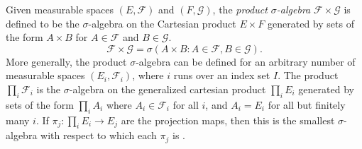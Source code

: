 \documentclass[12pt]{article}
\begin{document}

Given measurable spaces $(E,\mathcal{F})$ and $(F,\mathcal{G})$, the \emph{product $\sigma$-algebra} $\mathcal{F}\times\mathcal{G}$ is defined to be the $\sigma$-algebra on the Cartesian product $E\times F$ generated by sets of the form $A\times B$ for $A\in\mathcal{F}$ and $B\in\mathcal{G}$.
\begin{equation*}
\mathcal{F}\times\mathcal{G}=\sigma\left(A\times B\colon A\in\mathcal{F},B\in\mathcal{G}\right).
\end{equation*}
More generally, the product $\sigma$-algebra can be defined for an arbitrary number of measurable spaces $(E_i,\mathcal{F}_i)$, where $i$ runs over an index set $I$. The product $\prod_i\mathcal{F}_i$ is the $\sigma$-algebra on the generalized cartesian product $\prod_iE_i$ generated by sets of the form $\prod_iA_i$ where $A_i\in\mathcal{F}_i$ for all $i$, and $A_i=E_i$ for all but finitely many $i$.
If $\pi_j\colon\prod_iE_i\rightarrow E_j$ are the projection maps, then this is the smallest $\sigma$-algebra with respect to which each $\pi_j$ is .

\end{document}
